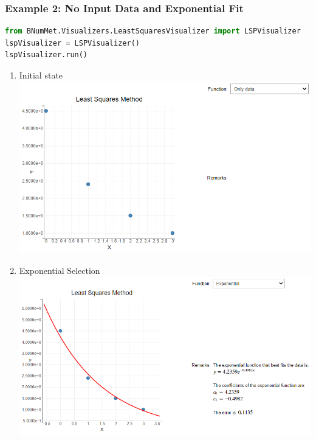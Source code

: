 \subsubsection{Example 2: No Input Data and Exponential Fit}
\begin{lstlisting}[language=Python]
from BNumMet.Visualizers.LeastSquaresVisualizer import LSPVisualizer
lspVisualizer = LSPVisualizer()
lspVisualizer.run()
\end{lstlisting}
\begin{enumerate}
    \item Initial state\\
    \includegraphics[scale=0.7]{Include/Images/Thesis/Documentation/Visualizers/LeastSquares/Example 2/Example 2 - 00 - Initial State.png}
    \item Exponential Selection\\
    \includegraphics[scale=0.7]{Include/Images/Thesis/Documentation/Visualizers/LeastSquares/Example 2/Example 2 - 00 - Exponential.png}
\end{enumerate}

